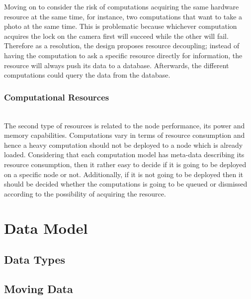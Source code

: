   Moving on to consider the risk of computations acquiring the same hardware resource at the same time, for instance, two computations that want to take a photo at the same time. This is problematic because whichever computation acquires the lock on the camera first will succeed while the other will fail. Therefore as a resolution, the design proposes resource decoupling; instead of having the computation to ask a specific resource directly for information, the resource will always push its data to a database. Afterwards, the different computations could query the data from the database.
  

\subsubsection{Computational Resources }\mbox{}\\

The second type of resources is related to the node performance, its power and memory capabilities. Computations vary in terms of resource consumption and hence a heavy computation should not be deployed to a node which is already loaded. Considering that each computation model has meta-data describing its resource consumption, then it rather easy to decide if it is going to be deployed on a specific node or not. Additionally, if it is not going to be deployed then it should be decided whether the computations is going to be queued or dismissed according to the possibility of acquiring the resource.




\section{Data Model}

\subsection{Data Types}


\subsection{Moving Data}

